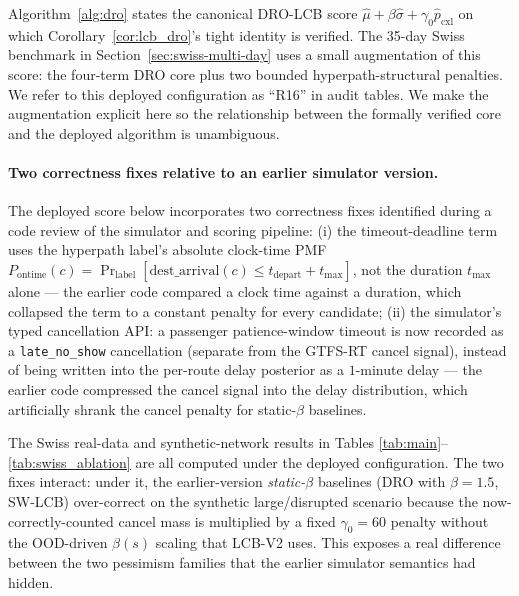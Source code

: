 \documentclass[11pt]{article}
\theoremstyle{definition}
\theoremstyle{remark}
\begin{document}
Algorithm~\ref{alg:dro} states the canonical DRO-LCB score
$\hat\mu + \beta\hat\sigma + \gamma_0\hat p_{\mathrm{cxl}}$ on which
Corollary~\ref{cor:lcb_dro}'s tight identity is verified. The
35-day Swiss benchmark in Section~\ref{sec:swiss-multi-day} uses
a small augmentation of this score: the four-term DRO core plus
two bounded hyperpath-structural penalties. We refer to this
deployed configuration as ``R16'' in audit tables. We make the
augmentation explicit here so the relationship between the
formally verified core and the deployed algorithm is unambiguous.

\paragraph{Two correctness fixes relative to an earlier simulator version.}
The deployed score below incorporates two correctness fixes
identified during a code review of the simulator and scoring
pipeline:
(i) the timeout-deadline term uses the hyperpath label's
absolute clock-time PMF $P_{\text{ontime}}(c) = \Pr_{\text{label}}[
\mathrm{dest\_arrival}(c) \leq t_{\mathrm{depart}}+t_{\max}]$, not
the duration $t_{\max}$ alone --- the earlier code compared a clock
time against a duration, which collapsed the term to a constant
penalty for every candidate;
(ii) the simulator's typed cancellation API: a passenger
patience-window timeout is now recorded as a \texttt{late\_no\_show}
cancellation (separate from the GTFS-RT cancel signal), instead of
being written into the per-route delay posterior as a $1$-minute
delay --- the earlier code compressed the cancel signal into the
delay distribution, which artificially shrank the cancel penalty
for static-$\beta$ baselines.

The Swiss real-data and synthetic-network results in Tables
\ref{tab:main}--\ref{tab:swiss_ablation} are all computed under
the deployed configuration. The two fixes interact: under it, the
earlier-version \emph{static-$\beta$}
baselines (DRO with $\beta\!=\!1.5$, SW-LCB) over-correct on the
synthetic large/disrupted scenario because the now-correctly-counted
cancel mass is multiplied by a fixed $\gamma_0\!=\!60$ penalty
without the OOD-driven $\beta(s)$ scaling that LCB-V2 uses. This
exposes a real difference between the two pessimism families that
the earlier simulator semantics had hidden.
\end{document}
